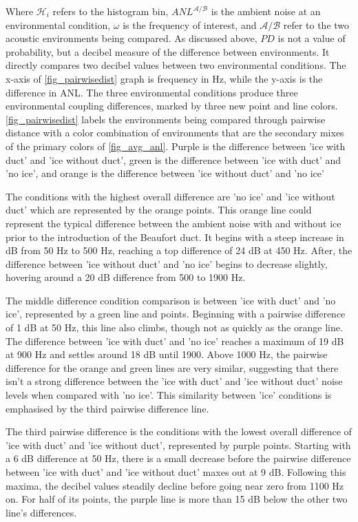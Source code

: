 Where $\mathcal{H}_{i}$ refers to the histogram bin, $ANL^{\mathcal{A/B}}$ is the ambient noise at an environmental condition, $\omega$ is the frequency of interest, and $\mathcal{A/B}$ refer to the two acoustic environments being compared. As discussed above, $PD$ is not a value of probability, but a decibel measure of the difference between environments. It directly compares two decibel values between two environmental conditions. The x-axis of \autoref{fig_pairwisedist} graph is frequency in Hz, while the y-axis is the difference in ANL. The three environmental conditions produce three environmental coupling differences, marked by three new point and line colors. \autoref{fig_pairwisedist} labels the environments being compared through pairwise distance with a color combination of environments that are the secondary mixes of the primary colors of \autoref{fig_avg_anl}. Purple is the difference between 'ice with duct' and 'ice without duct', green is the difference between 'ice with duct' and 'no ice', and orange is the difference between 'ice without duct' and 'no ice'


The conditions with the highest overall difference are 'no ice' and 'ice without duct' which are represented by the orange points. This orange line could represent the typical difference between the ambient noise with and without ice prior to the introduction of the Beaufort duct. It begins with a steep increase in dB from 50 Hz to 500 Hz, reaching a top difference of 24 dB at 450 Hz. After, the difference between 'ice without duct' and 'no ice' begins to decrease slightly, hovering around a 20 dB difference from 500 to 1900 Hz.

The middle difference condition comparison is between 'ice with duct' and 'no ice', represented by a green line and points. Beginning with a pairwise difference of 1 dB at 50 Hz, this line also climbs, though not as quickly as the orange line. The difference between 'ice with duct' and 'no ice' reaches a maximum of 19 dB at 900 Hz and settles around 18 dB until 1900. Above 1000 Hz, the pairwise difference for the orange and green lines are very similar, suggesting that there isn't a strong difference between the 'ice with duct' and 'ice without duct' noise levels when compared with 'no ice'. This  similarity between 'ice' conditions is emphasised by the third pairwise difference line.

The third pairwise difference is the conditions with the lowest overall difference of 'ice with duct' and 'ice without duct', represented by purple points. Starting with a 6 dB difference at 50 Hz, there is a small decrease before the pairwise difference between 'ice with duct' and 'ice without duct' maxes out at 9 dB. Following this maxima, the decibel values steadily decline before going near zero from 1100 Hz on. For half of its points, the purple line is more than 15 dB below the other two line's differences.  

